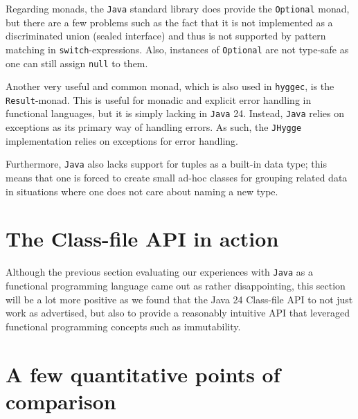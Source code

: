 Regarding monads, the \texttt{Java} standard library does provide the \texttt{Optional} monad, but there are a few problems such as the
fact that it is not implemented as a discriminated union (sealed interface) and thus is not supported by pattern matching in
\texttt{switch}-expressions. Also, instances of \texttt{Optional} are not type-safe as one can still assign \texttt{null} to them.

Another very useful and common monad, which is also used in \texttt{hyggec}, is the \texttt{Result}-monad. This is useful for monadic
and explicit error handling in functional languages, but it is simply lacking in \texttt{Java} 24. Instead, \texttt{Java} relies on
exceptions as its primary way of handling errors. As such, the \texttt{JHygge} implementation relies on exceptions for error handling.

Furthermore, \texttt{Java} also lacks support for tuples as a built-in data type; this means that one is forced to create small ad-hoc
classes for grouping related data in situations where one does not care about naming a new type.

\section{The Class-file API in action}

Although the previous section evaluating our experiences with \texttt{Java} as a functional programming language came out as rather disappointing,
this section will be a lot more positive as we found that the Java 24 Class-file API to not just work as advertised, but also to provide a
reasonably intuitive API that leveraged functional programming concepts such as immutability.

\section{A few quantitative points of comparison}
